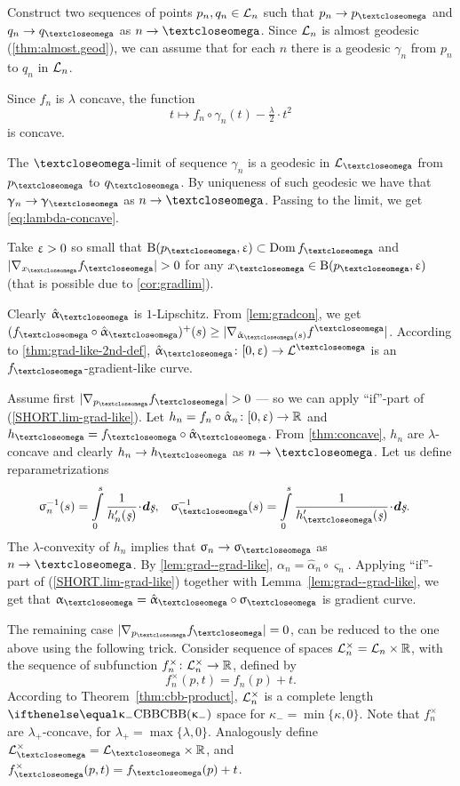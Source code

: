 Construct two sequences of points $p_n,q_n\in\spc{L}_n$ such that $p_n\to p_\o$ and $q_n\to q_\o$ as $n\to \o$.
Since $\mathcal{L}_n$ is almost geodesic (\ref{thm:almost.geod}), we can assume that for each $n$ there is a geodesic $\gamma_n$ from $p_n$ to $q_n$ in $\mathcal{L}_n$. 

Since $f_n$ is $\lambda$ concave, the function 
\[t\mapsto f_n\circ\gamma_n(t)-\tfrac\lambda 2\cdot t^2\]
is concave.

The $\o$-limit of sequence $\gamma_n$ is a geodesic in $\spc{L}_\o$ from $p_\o$ to $q_\o$.
By uniqueness of such geodesic we have that $\gamma_n\to \gamma_\o$ as $n\to \o$.
Passing to the limit, we get \ref{eq:lambda-concave}.

Take $\upvarepsilon>0$ so small that $\oBall(p_\o,\eps)\subset\Dom f_\o$ and $|\nabla_{x_\o}f_\o|>0$ for any $x_\o\in\oBall(p_\o,\eps)$ (that is possible due to \ref{cor:gradlim}).

Clearly $\hat\alpha_\o$ is $1$-Lipschitz.
From \ref{lem:gradcon}, we get 
$(f_\o\circ\hat\alpha_\o)^+(s)
\ge
|\nabla_{\hat\alpha_\o(s)}f^\o|$.
According to \ref{thm:grad-like-2nd-def}, $\hat\alpha_\o\:[0,\eps)\to \spc{L}^\o$  is an $f_\o$-gradient-like curve.

Assume first $|\nabla_{p_\o}f_\o|>0$ ---
so we can apply ``if''-part of (\ref{SHORT.lim-grad-like}).
Let $h_n=f_n\circ\hat\alpha_n\:[0,\eps)\to \RR$ 
and $h_\o=f_\o\circ\hat\alpha_\o$.
From \ref{thm:concave}, $h_n$ are $\lambda$-concave and clearly $h_n\to h_\o$ as $n\to\o$.
Let us define reparametrizations
\begin{align*}
{\varsigma_n^{-1}(s)}
&=
\int\limits_0^{s}\frac{1}{h_n'(\under s)}\cdot\dd\under s,
&
{\varsigma_\o^{-1}(s)}
&=
\int\limits_0^{s}\frac{1}{h_\o'(\under s)}\cdot\dd\under s.
\end{align*}
The $\lambda$-convexity of $h_n$ implies that $\sigma_n\to\sigma_\o$ as $n\to\o$.
By \ref{lem:grad--grad-like}, 
$\alpha_n=\hat\alpha_n\circ\varsigma_n$.
Applying ``if''-part of (\ref{SHORT.lim-grad-like}) together with Lemma~\ref{lem:grad--grad-like},
we get that $\alpha_\o=\hat\alpha_\o\circ\varsigma_\o$ is gradient curve.

The remaining case $|\nabla_{p_\o}f_\o|=0$, can be reduced to the one above using the following trick.
Consider sequence of spaces $\spc{L}_n^{\times}=\spc{L}_n\times\RR$,
with the sequence of subfunction $f^{\times}_n\:\spc{L}_n^{\times}\to\RR$, defined by
\[f^{\times}_n(p,t)=f_n(p)+t.\]
According to Theorem~\ref{thm:cbb-product}, 
$\spc{L}_n^{\times}$ is a complete length $\Alex{\kappa_-}$ space for $\kappa_-=\min\{\kappa,0\}$.
Note that $f_n^{\times}$ are $\lambda_+$-concave,
for $\lambda_+=\max\{\lambda,0\}$.
Analogously define  $\spc{L}_\o^{\times}=\spc{L}_\o\times\RR$,
and $f^{\times}_\o(p,t)=f_\o(p)+t$.

